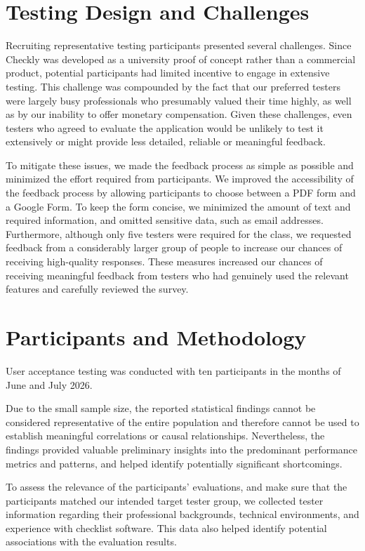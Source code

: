 \documentclass[11pt]{article}
\begin{document}
\section{Testing Design and Challenges}
Recruiting representative testing participants presented several challenges. Since Checkly was developed as a university proof of concept rather than a commercial product, potential participants had limited incentive to engage in extensive testing. This challenge was compounded by the fact that our preferred testers were largely busy professionals who presumably valued their time highly, as well as by our inability to offer monetary compensation. Given these challenges, even testers who agreed to evaluate the application would be unlikely to test it extensively or might provide less detailed, reliable or meaningful feedback.

To mitigate these issues, we made the feedback process as simple as possible and minimized the effort required from participants. We improved the accessibility of the feedback process by allowing participants to choose between a PDF form and a Google Form. To keep the form concise, we minimized the amount of text and required information, and omitted sensitive data, such as email addresses. Furthermore, although only five testers were required for the class, we requested feedback from a considerably larger group of people to increase our chances of receiving high-quality responses. These measures increased our chances of receiving meaningful feedback from testers who had genuinely used the relevant features and carefully reviewed the survey.

\section{Participants and Methodology}

User acceptance testing was conducted with ten participants in the months of June and July 2026. 

Due to the small sample size, the reported statistical findings cannot be considered representative of the entire population and therefore cannot be used to establish meaningful correlations or causal relationships. Nevertheless, the findings provided valuable preliminary insights into the predominant performance metrics and patterns, and helped identify potentially significant shortcomings.

To assess the relevance of the participants’ evaluations, and make sure that the participants matched our intended target tester group, we collected tester information regarding their professional backgrounds, technical environments, and experience with checklist software. This data also helped identify potential associations with the evaluation results.
\end{document}
